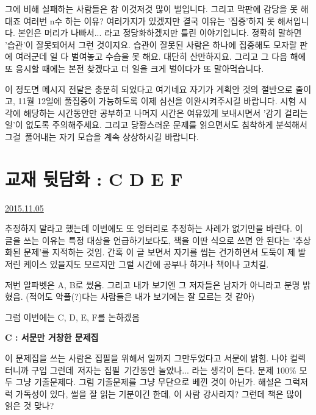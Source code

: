 그에 비해 실패하는 사람들은 참 이것저것 많이 벌입니다. 그리고 막판에 감당을 못 해대죠
여러번 n수 하는 이유? 여러가지가 있겠지만 결국 이유는 '집중'하지 못 해서입니다.
본인은 머리가 나빠서... 라고 정당화하겠지만 틀린 이야기입니다. 정확히 말하면 '습관'이 잘못되어서 그런 것이지요.
습관이 잘못된 사람은 하나에 집중해도 모자랄 판에 여러군데 일 다 벌여놓고 수습을 못 해요. 대단히 산만하지요.
그리고 그 다음 해에 또 응시할 때에는 본전 찾겠다고 더 일을 크게 벌이다가 또 말아먹습니다.
\vspace{5mm}

이 정도면 메시지 전달은 충분히 되었다고 여기네요
자기가 계획안 것의 절반으로 줄이고, 11월 12일에 풀집중이 가능하도록 이제 심신을 이완시켜주시길 바랍니다.
시험 시각에 해당하는 시간동안만 공부하고 나머지 시간은 여유있게 보내시면서 '감기 걸리는 일'이 없도록 주의해주세요.
그리고 당황스러운 문제를 읽으면서도 침착하게 분석해서 그걸 풀어내는 자기 모습을 계속 상상하시길 바랍니다.
\vspace{5mm}






\section{교재 뒷담화 : C D E F}
\href{https://www.kockoc.com/Apoc/465559}{2015.11.05}

\vspace{5mm}

추정하지 말라고 했는데 이번에도 또 엉터리로 추정하는 사례가 없기만을 바란다.
이 글을 쓰는 이유는 특정 대상을 언급하기보다도, 책을 이딴 식으로 쓰면 안 된다는 '추상화된 문제'를 지적하는 것임.
간혹 이 글 보면서 자기를 씹는 건가하면서 도둑이 제 발 저린 케이스 있을지도 모르지만 그럴 시간에 공부나 하거나 책이나 고치길.
\vspace{5mm}

저번 알파벳은 A, B로 썼음. 그리고 내가 보기엔 그 저자들은 남자가 아니라고 분명 밝혔음.
(적어도 악플(?)다는 사람들은 내가 보기에는 잘 모르는 것 같아)
\vspace{5mm}

그럼 이번에는 C, D, E, F를 논하겠음
\vspace{5mm}

\textbf{C : 서문만 거창한 문제집}
\vspace{5mm}

이 문제집을 쓰는 사람은 집필을 위해서 일까지 그만두었다고 서문에 밝힘. 나야 컬렉터니까 구입
그런데 저자는 집필 기간동안 놀았나... 라는 생각이 든다.
문제 100$\%$ 모두 그냥 기출문제다. 그럼 기출문제를 그냥 무단으로 베낀 것이 아닌가.
해설은 그럭저럭 가독성이 있다, 썰을 잘 읽는 기분이긴 한데, 이 사람 강사라지? 그런데 책은 많이 읽은 것 맞나?
\vspace{5mm}

